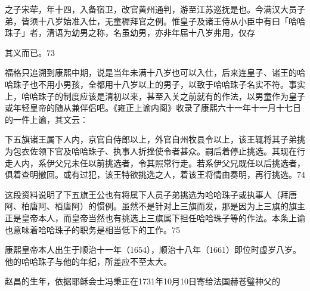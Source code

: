\vfill
\begin{BookNotes}
\end{BookNotes}

\begin{BookQuote}
之子宋荦，年十四，入备宿卫，改官黄州通判，游至江苏巡抚是也。今满汉大员子弟，皆须十八岁始准入仕，无童穉拜官之例。惟皇子及诸王侍从小臣中有曰「哈哈珠子」者，清语为幼男之称，名虽幼男，亦非年届十八岁弗用，仅存
\end{BookQuote}

其义而已。73

福格只追溯到康熙中期，说是当年未满十八岁也可以入仕，后来连皇子、诸王的哈哈珠子也不用小男孩，全都用十八岁以上的男子，以致于哈哈珠子名实不符。事实上，哈哈珠子的制度应该是清初以来，甚至入关之前就有的作法，以男童作为皇子或年轻皇帝的随从兼伴侣吧。《雍正上谕内阁》收录了康熙六十一年十一月十七日的一件上谕，其文云：

\begin{BookQuote}
下五旗诸王属下人内，京官自侍郎以上，外官自州牧县令以上，该王辄将其子弟挑为包衣佐领下官及哈哈珠子、执事人折挫使令者甚众。嗣后着停止挑选。其现在行走人内，系伊父兄未任以前挑选者，令其照常行走。若系伊父兄既任以后挑选者，俱着查明撤回。或有过犯，该王特欲挑选之人，着该王将情由奏明，再行挑选。74
\end{BookQuote}

这段资料说明了下五旗王公也有将属下人员子弟挑选为哈哈珠子或执事人（拜唐阿、柏唐阿、栢唐阿）的惯例。虽然不是针对上三旗而发，那是因为上三旗的旗主正是皇帝本人，而皇帝当然也有挑选上三旗属下担任哈哈珠子等的作法。本条上谕也意味着哈哈珠子的职务是相当低下的工作。75

康熙皇帝本人出生于顺治十一年（1654），顺治十八年（1661）即位时虚岁八岁。他的哈哈珠子与他的年纪，所差应不至太大。

赵昌的生年，依据耶稣会士冯秉正在1731年10月10日寄给法国赫苍璧神父的


